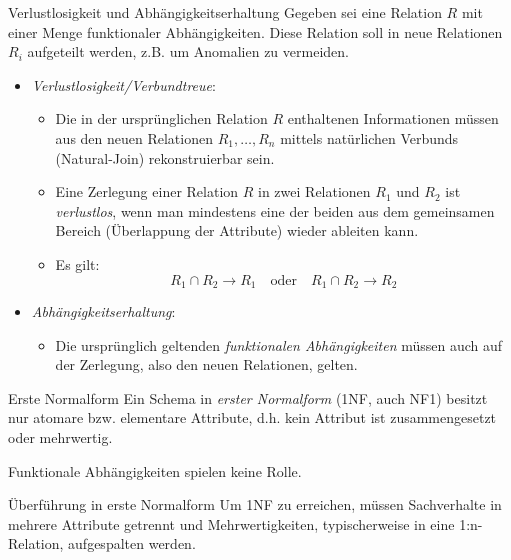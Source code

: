 \begin{defi}{Verlustlosigkeit und Abhängigkeitserhaltung}
    Gegeben sei eine Relation $R$ mit einer Menge funktionaler Abhängigkeiten.
    Diese Relation soll in neue Relationen $R_i$ aufgeteilt werden, z.B. um Anomalien zu vermeiden.

    \begin{itemize}
        \item \emph{Verlustlosigkeit/Verbundtreue}: \\
              \begin{itemize}
                  \item Die in der ursprünglichen Relation $R$ enthaltenen Informationen müssen aus den neuen Relationen $R_1, \ldots ,R_n$ mittels natürlichen Verbunds (Natural-Join) rekonstruierbar sein.
                  \item Eine Zerlegung einer Relation $R$ in zwei Relationen $R_1$ und $R_2$ ist \emph{verlustlos}, wenn man mindestens eine der beiden aus dem gemeinsamen Bereich (Überlappung der Attribute) wieder ableiten kann.
                  \item Es gilt:
                        \[
                            R_1 \cap R_2 \to R_1 \quad \text{oder} \quad R_1 \cap R_2 \to R_2
                        \]
              \end{itemize}
        \item \emph{Abhängigkeitserhaltung}: \\
              \begin{itemize}
                  \item Die ursprünglich geltenden \emph{funktionalen Abhängigkeiten} müssen auch auf der Zerlegung, also den neuen Relationen, gelten.
              \end{itemize}
    \end{itemize}
\end{defi}

\begin{defi}{Erste Normalform}
    Ein Schema in \emph{erster Normalform} (1NF, auch NF1) besitzt nur atomare bzw. elementare Attribute, d.h. kein Attribut ist zusammengesetzt oder mehrwertig.

    Funktionale Abhängigkeiten spielen keine Rolle.
\end{defi}

\begin{algo}{Überführung in erste Normalform}
    Um 1NF zu erreichen, müssen Sachverhalte in mehrere Attribute getrennt und Mehrwertigkeiten, typischerweise in eine 1:n-Relation, aufgespalten werden.
\end{algo}

